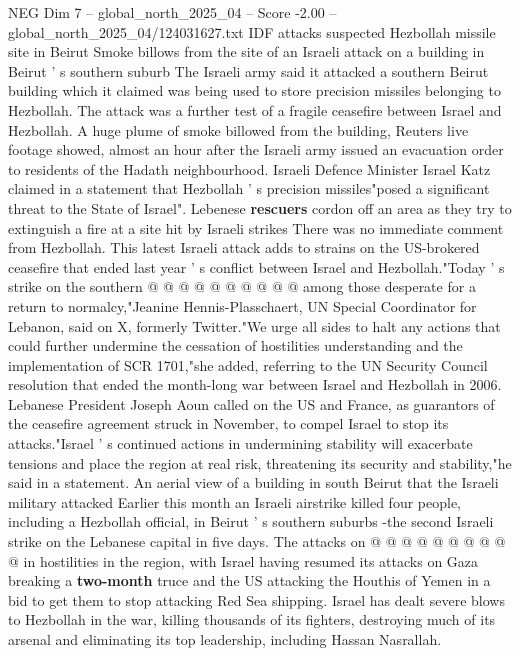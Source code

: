 \begin{textsample}{NEG Dim 7 – global\_north\_2025\_04 – Score -2.00 – global\_north\_2025\_04/124031627.txt}  \label{ex:f7_neg_091}
IDF attacks suspected Hezbollah missile site in Beirut Smoke billows from the site of an Israeli attack on a building in Beirut ' s southern suburb The Israeli army said it attacked a southern Beirut building which it claimed was being used to store precision missiles belonging to Hezbollah.
The attack was a further test of a fragile ceasefire between Israel and Hezbollah.
A huge plume of smoke billowed from the building, Reuters live footage showed, almost an hour after the Israeli army issued an evacuation order to residents of the Hadath neighbourhood.
Israeli Defence Minister Israel Katz claimed in a statement that Hezbollah ' s precision missiles"posed a significant threat to the State of Israel".
Lebenese \textbf{rescuers} cordon off an area as they try to extinguish a fire at a site hit by Israeli strikes There was no immediate comment from Hezbollah.
This latest Israeli attack adds to strains on the US-brokered ceasefire that ended last year ' s conflict between Israel and Hezbollah."Today ' s strike on the southern @ @ @ @ @ @ @ @ @ @ among those desperate for a return to normalcy,"Jeanine Hennis-Plasschaert, UN Special Coordinator for Lebanon, said on X, formerly Twitter."We urge all sides to halt any actions that could further undermine the cessation of hostilities understanding and the implementation of SCR 1701,"she added, referring to the UN Security Council resolution that ended the month-long war between Israel and Hezbollah in 2006.
Lebanese President Joseph Aoun called on the US and France, as guarantors of the ceasefire agreement struck in November, to compel Israel to stop its attacks."Israel ' s continued actions in undermining stability will exacerbate tensions and place the region at real risk, threatening its security and stability,"he said in a statement.
An aerial view of a building in south Beirut that the Israeli military attacked Earlier this month an Israeli airstrike killed four people, including a Hezbollah official, in Beirut ' s southern suburbs -the second Israeli strike on the Lebanese capital in five days.
The attacks on @ @ @ @ @ @ @ @ @ @ in hostilities in the region, with Israel having resumed its attacks on Gaza breaking a \textbf{two-month} truce and the US attacking the Houthis of Yemen in a bid to get them to stop attacking Red Sea shipping.
Israel has dealt severe blows to Hezbollah in the war, killing thousands of its fighters, destroying much of its arsenal and eliminating its top leadership, including Hassan Nasrallah.

\end{textsample}
